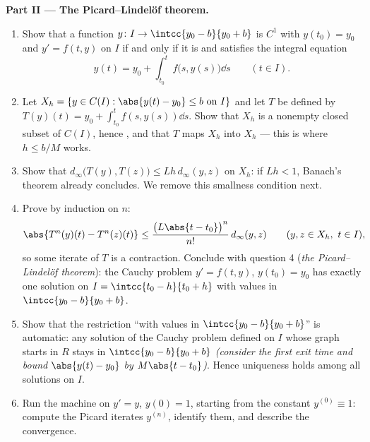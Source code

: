 \begin{problem}
\medskip
\noindent\textbf{Part II --- The Picard--Lindel\"of theorem.}
\begin{enumerate}[resume]
  \item Show that a function $y \colon I \to \intcc{y_0 - b}{y_0
        + b}$ is $C^1$ with $y(t_0) = y_0$ and $y' = f(t, y)$ on
        $I$ if and only if it is  and satisfies the
        integral equation
        \[
        y(t) = y_0 + \int_{t_0}^{t} f\bigl(s, y(s)\bigr)\dd s
        \qquad (t \in I).
        \]
  \item Let $X_h = \{y \in C(I) : \abs{y(t) - y_0} \leq b
        \text{ on } I\}$ and let $T$ be defined by $T(y)(t) =
        y_0 + \int_{t_0}^{t}f(s, y(s))\dd s$. Show that $X_h$ is
        a nonempty closed subset of $C(I)$, hence , and
        that $T$ maps $X_h$ into $X_h$ --- this is where $h \leq
        b/M$ works.
  \item Show that $d_\infty\bigl(T(y), T(z)\bigr) \leq
        Lh\,d_\infty(y, z)$ on $X_h$: if $Lh < 1$, Banach's
        theorem already concludes. We remove this smallness
        condition next.
  \item Prove by induction on $n$:
        \[
        \abs{T^n(y)(t) - T^n(z)(t)} \leq
        \frac{\bigl(L\abs{t - t_0}\bigr)^n}{n!}\,
        d_\infty(y, z) \qquad (y, z \in X_h,\ t \in I),
        \]
        so some iterate of $T$ is a contraction. Conclude with
        question 4 (\emph{the Picard--Lindel\"of theorem}): the
        Cauchy problem $y' = f(t,y)$, $y(t_0) = y_0$ has exactly
        one solution on $I = \intcc{t_0 - h}{t_0 + h}$ with
        values in $\intcc{y_0 - b}{y_0 + b}$.
  \item Show that the restriction ``with values in $\intcc{y_0 -
        b}{y_0 + b}$'' is automatic: any solution of the Cauchy
        problem defined on $I$ whose graph starts in $R$ stays
        in $\intcc{y_0 - b}{y_0 + b}$ \emph{(consider the first
        exit time and bound $\abs{y(t) - y_0}$ by $M\abs{t -
        t_0}$)}. Hence uniqueness holds among all solutions on
        $I$.
  \item Run the machine on $y' = y$, $y(0) = 1$, starting from
        the constant $y^{(0)} \equiv 1$: compute the Picard
        iterates $y^{(n)}$, identify them, and describe the
        convergence.
\end{enumerate}


\end{problem}
